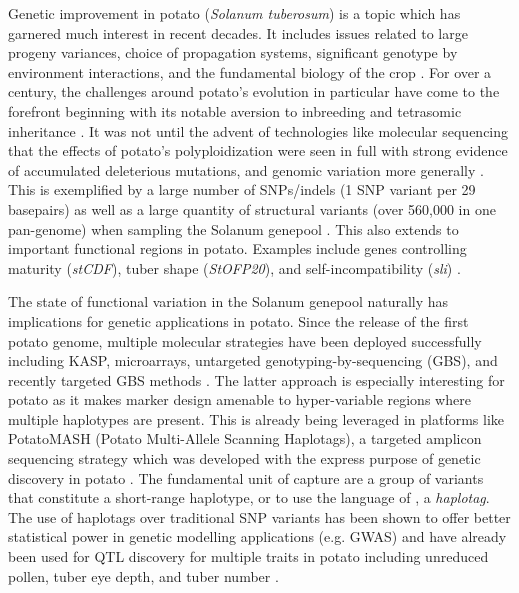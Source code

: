 Genetic improvement in potato (\emph{Solanum tuberosum}) is a topic
which has garnered much interest in recent decades. It includes issues related to large progeny variances,
choice of propagation systems, significant genotype by environment
interactions, and the fundamental biology of the crop
\autocite{Mendoza1974,Tai1979,Almekinders2009}. For over a century, the
challenges around potato's evolution in particular have come to the
forefront beginning with its notable aversion to inbreeding and
tetrasomic inheritance \autocite{Krantz1924,Swaminathan1954}. It was not
until the advent of technologies like molecular sequencing that the
effects of potato's polyploidization were seen in full with strong
evidence of accumulated deleterious mutations, and genomic variation
more generally
\autocite{Lian2019,Hardigan2016,Marand2019,Kyriakidou2020}. This is
exemplified by a large number of SNPs/indels (1 SNP variant per 29
basepairs) as well as a large quantity of structural variants (over
560,000 in one pan-genome) when sampling the Solanum genepool
\autocite{ThePotatoGenomeSequencingConsortium2011,Tang2022}. This also
extends to important functional regions in potato. Examples include
genes controlling maturity (\emph{stCDF}), tuber shape (\emph{StOFP20}),
and self-incompatibility (\emph{sli})
\autocite{Kloosterman2013,Eck2022,Ames2024}.

The state of functional variation in the Solanum genepool naturally has
implications for genetic applications in potato. Since the release of
the first potato genome, multiple molecular strategies have been
deployed successfully including KASP, microarrays, untargeted
genotyping-by-sequencing (GBS), and recently targeted GBS methods
\autocite{Vos2015,Meijer2018,Wilson2021,Endelman2024}. The latter
approach is especially interesting for potato as it makes marker design
amenable to hyper-variable regions where multiple haplotypes are
present. This is already being leveraged in platforms like PotatoMASH
(Potato Multi-Allele Scanning Haplotags), a targeted amplicon sequencing
strategy which was developed with the express purpose of genetic
discovery in potato \autocite{Leyva-Perez2022}. The fundamental unit of
capture are a group of variants that constitute a short-range
haplotype, or to use the language of \autocite{Tinker2016}, a
\emph{haplotag}. The use of haplotags over traditional SNP variants has
been shown to offer better statistical power in genetic modelling
applications (e.g. GWAS) and have already been used for QTL discovery
for multiple traits in potato including unreduced pollen, tuber eye
depth, and tuber number
\autocite{ThereseNavarro2022,Clot2024,Vexler2024}.


